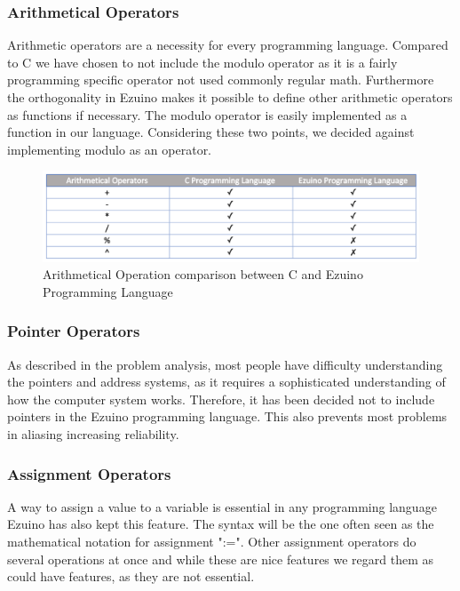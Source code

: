\subsubsection*{Arithmetical Operators}
Arithmetic operators are a necessity for every programming language. 
Compared to C we have chosen to not include the modulo operator as it is a fairly programming specific operator not used commonly regular math. Furthermore the orthogonality in Ezuino makes it possible to define other arithmetic operators as functions if necessary. The modulo operator is easily implemented as a function in our language. Considering these two points, we decided against implementing modulo as an operator.
\begin{figure}[H]
\centering
\includegraphics[scale=0.60]{figures/language_features/langf05.png}
\caption{Arithmetical Operation comparison between C and Ezuino Programming Language}
\label{lf05}
\end{figure}

\subsubsection*{Pointer Operators}
As described in the problem analysis, most people have difficulty understanding the pointers and address systems, as it requires a sophisticated understanding of how the computer system works. Therefore, it has been decided not to include pointers in the Ezuino programming language. This also prevents most problems in aliasing increasing reliability.
\subsubsection*{Assignment Operators}
A way to assign a value to a variable is essential in any programming language Ezuino has also kept this feature. The syntax will be the one often seen as the mathematical notation for assignment ":=". Other assignment operators do several operations at once and while these are nice features we regard them as could have features, as they are not essential.
